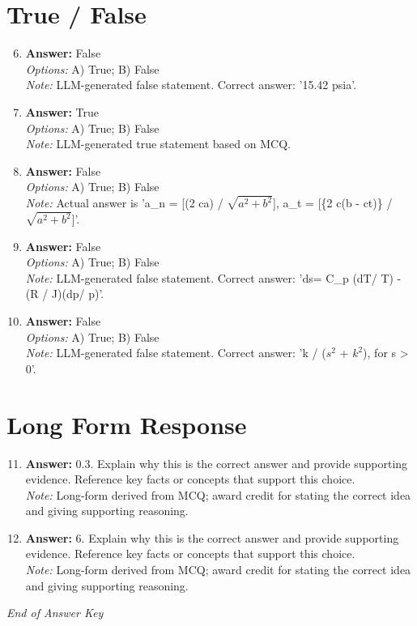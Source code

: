 \documentclass[12pt]{article}
\begin{document}
\section*{True / False}
\begin{enumerate}[label=\arabic*.]
\setcounter{enumi}{5}
\item \textbf{Answer:} False
\\ \textit{Options:} A) True; B) False
\\ \textit{Note:} LLM-generated false statement. Correct answer: '15.42 psia'.
\item \textbf{Answer:} True
\\ \textit{Options:} A) True; B) False
\\ \textit{Note:} LLM-generated true statement based on MCQ.
\item \textbf{Answer:} False
\\ \textit{Options:} A) True; B) False
\\ \textit{Note:} Actual answer is 'a\_n = [(2 ca) / \ensuremath{\surd{a^2 + b^2}}], a\_t = [\{2 c(b - ct)\} / \ensuremath{\surd{a^2 + b^2}}]'.
\item \textbf{Answer:} False
\\ \textit{Options:} A) True; B) False
\\ \textit{Note:} LLM-generated false statement. Correct answer: 'ds= C\_p (dT/ T) - (R / J)(dp/ p)'.
\item \textbf{Answer:} False
\\ \textit{Options:} A) True; B) False
\\ \textit{Note:} LLM-generated false statement. Correct answer: 'k / ($s^2$ + $k^2$), for s \textgreater{} 0'.
\end{enumerate}

\section*{Long Form Response}
\begin{enumerate}[label=\arabic*.]
\setcounter{enumi}{10}
\item \textbf{Answer:} 0.3. Explain why this is the correct answer and provide supporting evidence. Reference key facts or concepts that support this choice.
\\ \textit{Note:} Long-form derived from MCQ; award credit for stating the correct idea and giving supporting reasoning.
\item \textbf{Answer:} 6. Explain why this is the correct answer and provide supporting evidence. Reference key facts or concepts that support this choice.
\\ \textit{Note:} Long-form derived from MCQ; award credit for stating the correct idea and giving supporting reasoning.
\end{enumerate}

\vfill
\noindent\textit{End of Answer Key}
\end{document}
